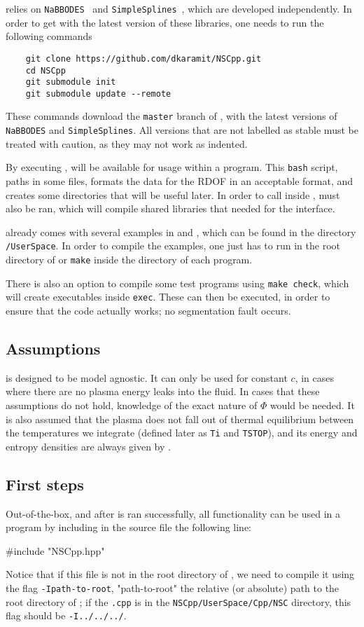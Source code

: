 \documentclass[11pt,a4paper]{article}
\begin{document}
\nsc relies on {\tt NaBBODES}~\cite{NaBBODES} and {\tt SimpleSplines}~\cite{SimpleSplines}, which are developed independently. In order to get \nsc with the latest version of these libraries, one needs to run the following commands
%
\begin{lstlisting}
	git clone https://github.com/dkaramit/NSCpp.git
	cd NSCpp
	git submodule init
	git submodule update --remote
\end{lstlisting}
%
These commands download the {\tt master} branch of \nsc, with the latest versions of {\tt NaBBODES} and {\tt SimpleSplines}. All versions that are not labelled as stable must be treated with caution, as they may not work as indented. 

By executing , \nsc will be available for usage within a \CPP program. This {\tt bash} script, paths in some files, formats the data for the RDOF in an acceptable format, and creates some directories that will be useful later. In order to call \nsc inside \PY,  must also be ran,  which will compile shared libraries that needed for the \PY interface.

\nsc already comes with several examples in \CPP and \PY, which can be found in the directory {\tt \nsc/UserSpace}. In order to compile the \CPP examples, one just has to run  in the root directory of \nsc or {\tt make} inside the directory of each \CPP program.

There is also an option to compile some test programs using {\tt make check}, which will create executables inside {\tt exec}. These can then be executed, in order to ensure that the code actually works; \eg no segmentation fault occurs. 

\subsection{Assumptions}
%
\nsc is designed to be model agnostic. It can only be used for constant $c$, in cases where there are no plasma energy leaks into the fluid. In cases that these assumptions do not hold, knowledge of the exact nature of $\Phi$ would be needed.  It is also assumed that the plasma does not fall out of thermal equilibrium between the temperatures we integrate (defined later as {\tt Ti} and {\tt TSTOP}), and its energy and entropy densities are always given by .

\subsection{First steps}\label{sec:First_examples} 
%
Out-of-the-box, and after  is ran successfully, all \nsc functionality can be used in a \CPP program by including in the source file the following line:
%
\begin{cpp}
	#include "NSCpp.hpp"
\end{cpp}
%
Notice that if this file is not in the root directory of \nsc, we need to compile it using the flag {\tt -Ipath-to-root}, "path-to-root" the relative (or absolute) path to the root directory of \nsc; \eg if the {\tt .cpp} is in the {\tt NSCpp/UserSpace/Cpp/NSC} directory, this flag should be {\tt -I../../../}. 
\end{document}
